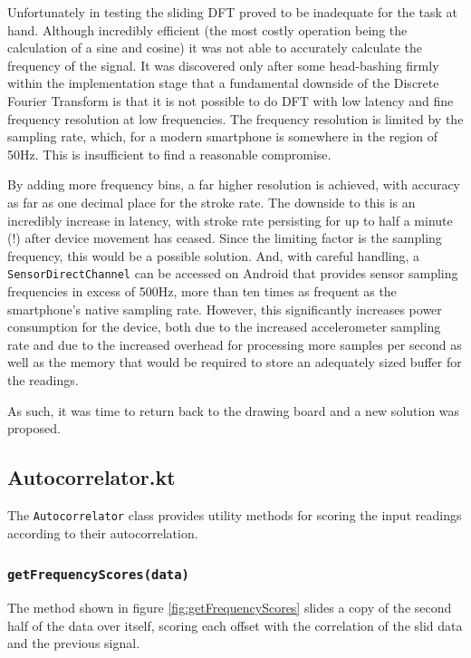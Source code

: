 \documentclass[11pt,twoside,a4paper]{report}
\begin{document}
Unfortunately in testing the sliding DFT proved to be inadequate for the task at hand. Although incredibly efficient (the most costly operation being the calculation of a sine and cosine) it was not able to accurately calculate the frequency of the signal. It was discovered only after some head-bashing firmly within the implementation stage that a fundamental downside of the Discrete Fourier Transform is that it is not possible to do DFT with low latency and fine frequency resolution at low frequencies.\cite{dsp_stack_dft} The frequency resolution is limited by the sampling rate, which, for a modern smartphone is somewhere in the region of 50Hz. This is insufficient to find a reasonable compromise.

By adding more frequency bins, a far higher resolution is achieved, with accuracy as far as one decimal place for the stroke rate. The downside to this is an incredibly increase in latency, with stroke rate persisting for up to half a minute (!) after device movement has ceased. Since the limiting factor is the sampling frequency, this would be a possible solution. And, with careful handling, a \texttt{SensorDirectChannel} can be accessed on Android that provides sensor sampling frequencies in excess of 500Hz, more than ten times as frequent as the smartphone's native sampling rate. However, this significantly increases power consumption for the device, both due to the increased accelerometer sampling rate and due to the increased overhead for processing more samples per second as well as the memory that would be required to store an adequately sized buffer for the readings.

As such, it was time to return back to the drawing board and a new solution was proposed.


\subsection{Autocorrelator.kt}

The \texttt{Autocorrelator} class provides utility methods for scoring the input readings according to their autocorrelation.

\subsubsection{\texttt{getFrequencyScores(data)}}

The method shown in figure \ref{fig:getFrequencyScores} slides a copy of the second half of the data over itself, scoring each offset with the correlation of the slid data and the previous signal.
\end{document}
